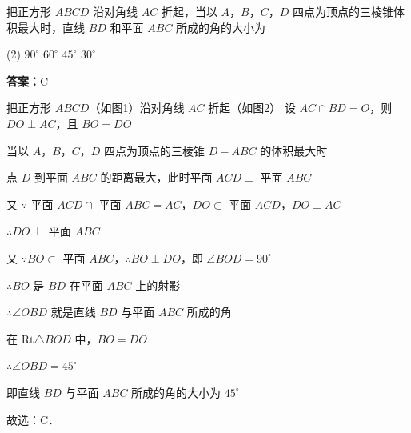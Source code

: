 \vspace{2em}


\begin{example}[\bkstar{3}{5}]
把正方形 $ABCD$ 沿对角线 $AC$ 折起，当以 $A$，$B$，$C$，$D$ 四点为顶点的三棱锥体积最大时，直线 $BD$ 和平面 $ABC$ 所成的角的大小为
\begin{tasks}(2)
    \task $90^{\circ}$
    \task $60^{\circ}$
    \task $45^{\circ}$
    \task $30^{\circ}$
\end{tasks}
\end{example}
\begin{solution}
\textbf{答案：}C

把正方形 $ABCD$（如图1）沿对角线 $AC$ 折起（如图2）
设 $AC\cap BD=O$，则 $DO\perp AC$，且 $BO=DO$

当以 $A$，$B$，$C$，$D$ 四点为顶点的三棱锥 $D-ABC$ 的体积最大时

点 $D$ 到平面 $ABC$ 的距离最大，此时平面 $ACD\perp$ 平面 $ABC$

又 $\because$ 平面 $ACD\cap$ 平面 $ABC=AC$，$DO\subset$ 平面 $ACD$，$DO\perp AC$

$\therefore DO\perp$ 平面 $ABC$

又 $\because BO\subset$ 平面 $ABC$，$\therefore BO\perp DO$，即 $\angle BOD=90^{\circ}$

$\therefore BO$ 是 $BD$ 在平面 $ABC$ 上的射影

$\therefore \angle OBD$ 就是直线 $BD$ 与平面 $ABC$ 所成的角

在 $\mathrm{Rt}\triangle BOD$ 中，$BO=DO$

$\therefore \angle OBD=45^{\circ}$

即直线 $BD$ 与平面 $ABC$ 所成的角的大小为 $45^{\circ}$

故选：C．
\end{solution}

\vspace{2em}

